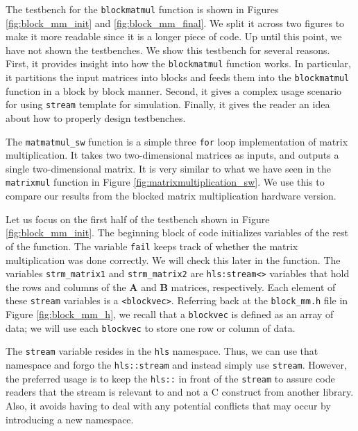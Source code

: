 The testbench for the \lstinline{blockmatmul} function is shown in Figures \ref{fig:block_mm_init} and \ref{fig:block_mm_final}. We split it across two figures to make it more readable since it is a longer piece of code. Up until this point, we have not shown the testbenches. We show this testbench for several reasons. First, it provides insight into how the \lstinline{blockmatmul} function works. In particular, it partitions the input matrices into blocks and feeds them into the \lstinline{blockmatmul} function in a block by block manner. Second, it gives a complex usage scenario for using \lstinline{stream} template for simulation. Finally, it gives the reader an idea about how to properly design testbenches.

The \lstinline{matmatmul_sw} function is a simple three \lstinline{for} loop implementation of matrix multiplication. It takes two two-dimensional matrices as inputs, and outputs a single two-dimensional matrix. It is very similar to what we have seen in the \lstinline{matrixmul} function in Figure \ref{fig:matrixmultiplication_sw}. We use this to compare our results from the blocked matrix multiplication hardware version.

Let us focus on the first half of the testbench shown in Figure \ref{fig:block_mm_init}. The beginning block of code initializes variables of the rest of the function. The variable \lstinline{fail} keeps track of whether the matrix multiplication was done correctly. We will check this later in the function. The variables \lstinline{strm_matrix1} and \lstinline{strm_matrix2} are \lstinline{hls:stream<>} variables that hold the rows and columns of the $\mathbf{A}$ and $\mathbf{B}$ matrices, respectively. Each element of these \lstinline{stream} variables is a \lstinline{<blockvec>}. Referring back at the \lstinline{block_mm.h} file in Figure \ref{fig:block_mm_h}, we recall that a \lstinline{blockvec} is defined as an array of data; we will use each \lstinline{blockvec} to store one row or column of data. 

\begin{aside}
The \lstinline{stream} variable resides in the \lstinline{hls} namespace. Thus, we can use that namespace and forgo the \lstinline{hls::stream} and instead simply use \lstinline{stream}. However, the preferred usage is to keep the \lstinline{hls::} in front of the \lstinline{stream} to assure code readers that the stream is relevant to \VHLS and not a C construct from another library. Also, it avoids having to deal with any potential conflicts that may occur by introducing a new namespace.
\end{aside}

